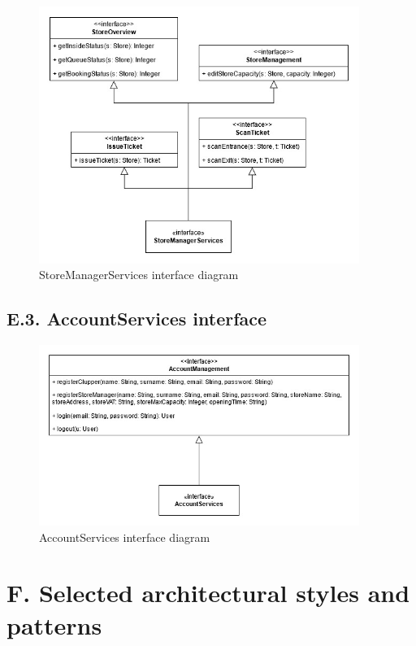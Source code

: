 \begin{figure}[H]
\centering
\includegraphics[width=0.93\textwidth]{component_interface_diagrams/store_manager_component_interface_diagram}
\caption{StoreManagerServices interface diagram}
\end{figure}

\subsection{E.3. AccountServices interface}

\begin{figure}[H]
\centering
\includegraphics[width=0.93\textwidth]{component_interface_diagrams/account_management_component_interface_diagram}
\caption{AccountServices interface diagram}
\end{figure}

\section{F. Selected architectural styles and patterns}


